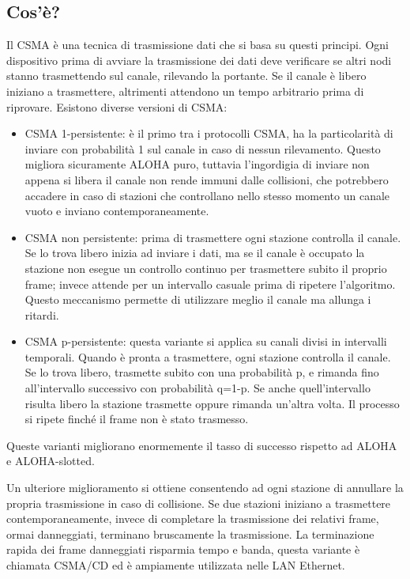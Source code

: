 \subsection{Cos'è?}
Il CSMA è una tecnica di trasmissione dati che si basa su questi principi.
Ogni dispositivo prima di avviare la trasmissione dei dati deve verificare se altri nodi stanno trasmettendo sul canale, rilevando la portante.
Se il canale è libero iniziano a trasmettere, altrimenti attendono un tempo arbitrario prima di riprovare.
Esistono diverse versioni di CSMA:
\begin{itemize}
\item	CSMA 1-persistente: è il primo tra i protocolli CSMA, ha la particolarità di inviare con probabilità 1 sul canale in caso di nessun rilevamento.
Questo migliora sicuramente ALOHA puro, tuttavia l'ingordigia di inviare non appena si libera il canale non rende immuni dalle collisioni, che potrebbero accadere in caso di stazioni che controllano nello stesso momento un canale vuoto e inviano contemporaneamente.
\item	CSMA non persistente: prima di trasmettere ogni stazione controlla il canale.
Se lo trova libero inizia ad inviare i dati, ma se il canale è occupato la stazione non esegue un controllo continuo per trasmettere subito il proprio frame;
invece attende per un intervallo casuale prima di ripetere l'algoritmo. Questo meccanismo permette di utilizzare meglio il canale ma allunga i ritardi.
\item	CSMA p-persistente: questa variante si applica su canali divisi in intervalli temporali.
Quando è pronta a trasmettere, ogni stazione controlla il canale.
Se lo trova libero, trasmette subito con una probabilità p, e rimanda fino all'intervallo successivo con probabilità q=1-p.
Se anche quell'intervallo risulta libero la stazione trasmette oppure rimanda un'altra volta. Il processo si ripete finché il frame non è stato trasmesso.
\end{itemize}
Queste varianti migliorano enormemente il tasso di successo rispetto ad ALOHA e ALOHA-slotted.

Un ulteriore miglioramento si ottiene consentendo ad ogni stazione di annullare la propria trasmissione in caso di collisione.
Se due stazioni iniziano a trasmettere contemporaneamente, invece di completare la trasmissione dei relativi frame, ormai danneggiati, terminano bruscamente la trasmissione.
La terminazione rapida dei frame danneggiati risparmia tempo e banda, questa variante è chiamata CSMA/CD ed è ampiamente utilizzata nelle LAN Ethernet.

